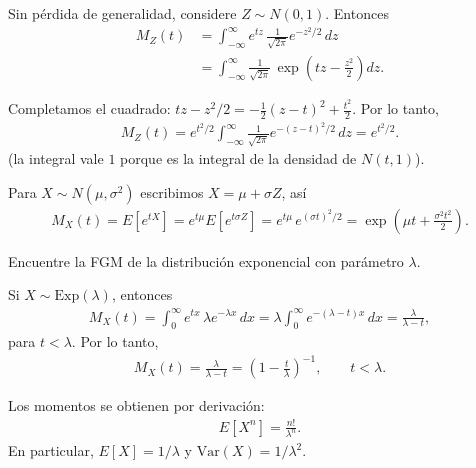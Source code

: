 \begin{solucion}
Sin pérdida de generalidad, considere $Z \sim N(0,1)$. Entonces
\begin{align}
 M_Z(t) &= \int_{-\infty}^{\infty} e^{tz}\,\frac{1}{\sqrt{2\pi}}e^{-z^2/2}\,dz \\
 &= \int_{-\infty}^{\infty} \frac{1}{\sqrt{2\pi}}\,\exp\!\left(tz - \frac{z^2}{2}\right)dz.
\end{align}

Completamos el cuadrado: $tz - z^2/2 = -\frac{1}{2}(z - t)^2 + \frac{t^2}{2}$. Por lo tanto,
\begin{align}
 M_Z(t) = e^{t^2/2}\int_{-\infty}^{\infty} \frac{1}{\sqrt{2\pi}}e^{-(z-t)^2/2}\,dz = e^{t^2/2}.
\end{align}
(la integral vale $1$ porque es la integral de la densidad de $N(t, 1)$).

Para $X \sim N(\mu,\sigma^2)$ escribimos $X = \mu + \sigma Z$, así
\begin{align}
 \label{eq:2.8.14}
 M_X(t) = E[e^{tX}] = e^{t\mu}E[e^{t\sigma Z}] = e^{t\mu}\,e^{(\sigma t)^2/2}
 = \exp\!\left(\mu t + \frac{\sigma^2 t^2}{2}\right).
\end{align}
\end{solucion}

\begin{ejemplo}
 \label{exmp:2.8.6}
Encuentre la FGM de la distribución exponencial con parámetro $\lambda$.
\end{ejemplo}

\begin{solucion}
Si $X \sim \text{Exp}(\lambda)$, entonces
\begin{align}
 M_X(t) = \int_0^\infty e^{tx}\,\lambda e^{-\lambda x}\,dx
 = \lambda\int_0^\infty e^{-(\lambda - t)x}\,dx = \frac{\lambda}{\lambda - t},
\end{align}
para $t < \lambda$. Por lo tanto,
\begin{align}
 \label{eq:2.8.15}
 M_X(t) = \frac{\lambda}{\lambda - t} = \left(1 - \frac{t}{\lambda}\right)^{-1},
 \qquad t < \lambda.
\end{align}

Los momentos se obtienen por derivación:
\begin{align}
 E[X^n] = \frac{n!}{\lambda^n}.
\end{align}
En particular, $E[X] = 1/\lambda$ y $\text{Var}(X) = 1/\lambda^2$.
\end{solucion}



